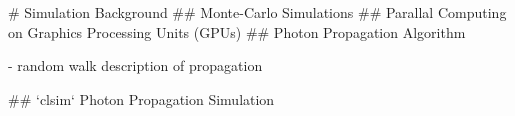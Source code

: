 # Simulation Background
## Monte-Carlo Simulations
## Parallal Computing on Graphics Processing Units (GPUs)
## Photon Propagation Algorithm

- random walk description of propagation \cite{absorption1997}

## `clsim` Photon Propagation Simulation
